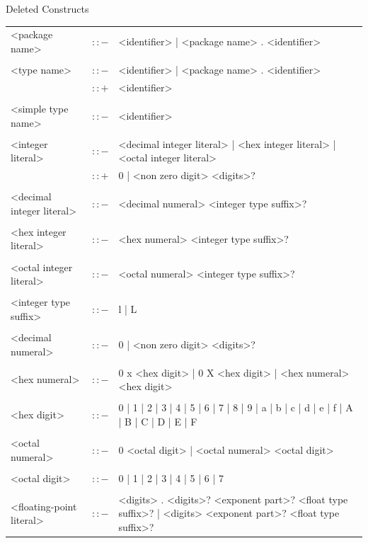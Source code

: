 \documentclass[landscape, 11pt]{article}
\begin{document}
\begin{qsection}{Deleted Constructs}
\begin{enumerate}[label=\bt{\theenumi.}]
		\ditem[Tokens.]
			\begin{longtable}{R{7cm} c L{15cm}}
				<package name>								&	$\colon\colon-$	&	<identifier> | <package name> . <identifier> \\\\
				<type name>									&	$\colon\colon-$	&	<identifier> | <package name> . <identifier> \\
															&	$\colon\colon+$	&	<identifier> \\\\
				<simple type name>							&	$\colon\colon-$	&	<identifier> \\\\
				<integer literal>							&	$\colon\colon-$	&	<decimal integer literal> | <hex integer literal> | <octal integer literal> \\
															&	$\colon\colon+$	&	0 | <non zero digit> <digits>? \\\\
				<decimal integer literal>					&	$\colon\colon-$	&	<decimal numeral> <integer type suffix>? \\\\
				<hex integer literal>						&	$\colon\colon-$	&	<hex numeral> <integer type suffix>? \\\\
				<octal integer literal>						&	$\colon\colon-$	&	<octal numeral> <integer type suffix>? \\\\
				<integer type suffix>						&	$\colon\colon-$	&	l | L \\\\
				<decimal numeral>							&	$\colon\colon-$	&	0 | <non zero digit> <digits>? \\\\
				<hex numeral>								&	$\colon\colon-$	&	0 x <hex digit> | 0 X <hex digit> | <hex numeral> <hex digit> \\\\
				<hex digit>									&	$\colon\colon-$	&	0 | 1 | 2 | 3 | 4 | 5 | 6 | 7 | 8 | 9 | a | b | c | d | e | f | A | B | C | D | E | F \\\\
				<octal numeral>								&	$\colon\colon-$	&	0 <octal digit> | <octal numeral> <octal digit> \\\\
				<octal digit>								&	$\colon\colon-$	&	0 | 1 | 2 | 3 | 4 | 5 | 6 | 7 \\\\
				<floating-point literal>					&	$\colon\colon-$	&	<digits> . <digits>? <exponent part>? <float type suffix>? | <digits> <exponent part>? <float type suffix>? \\

\end{longtable}
\end{enumerate}
\end{qsection}
\end{document}
